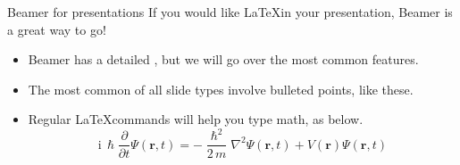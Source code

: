 \begin{frame}{Beamer for presentations}
If you would like \LaTeX in your presentation, Beamer is a great way to go!
\begin{itemize}
\item Beamer has a detailed
, but we will go over the most common features.
\item The most common of all slide types involve bulleted points, like these.
\item Regular \LaTeX commands will help you type math, as below.
\begin{equation*}
\mathrm{i}\,\hslash\frac{\partial}{\partial t} \Psi(\mathbf{r},t) = -\frac{\hslash^2}{2\,m}\nabla^2\Psi(\mathbf{r},t) + V(\mathbf{r})\Psi(\mathbf{r},t)
\end{equation*}
\end{itemize}
\end{frame}


